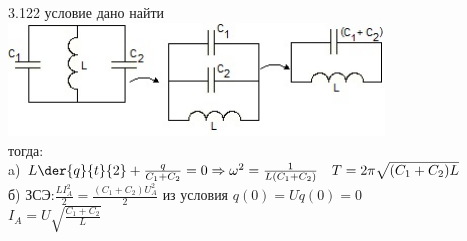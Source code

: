 \testCom
{%
	3.122
}
{%
	условие
}
{%
	дано
}
{%
	найти
}
{%
	\includegraphics[height=30mm]{3_122.jpg}\\
	тогда:\\
	a) $ L \der{q}{t}{2} + \frac{q}{C_1 + C_2} = 0 \Rightarrow \omega^2 = \frac{1}{L(C_1 + C_2)} \quad T = 2 \pi \sqrt{(C_1 + C_2) L}$\\
	б) ЗСЭ:$ \frac{LI_A^2}{2} = \frac{(C_1 + C_2) U_A^2}{2}$ из условия $q(0) = U \dot q(0) = 0$\\
	$I_A = U \sqrt{\frac{C_1 + C_2}{L}}$\\
}

